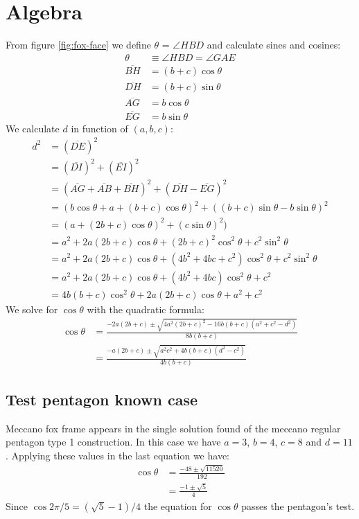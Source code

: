 \documentclass[11pt]{article}
\begin{document}
\section{Algebra}
From figure \ref{fig:fox-face} we define $\theta$ = $\angle{HBD}$ and calculate sines and cosines:
\begin{align}
\theta &\equiv \angle{HBD} = \angle{GAE}\\
\overline{BH} &= (b+c)\cos{\theta}\\
\overline{DH} &= (b+c)\sin{\theta}\\
\overline{AG} &= b\cos{\theta}\\
\overline{EG} &= b\sin{\theta}
\end{align}
We calculate $d$ in function of $(a,b,c)$:
\begin{align}
d^2 &= (\overline{DE})^2 \nonumber\\
 &= (\overline{DI})^2 + (\overline{EI})^2 \nonumber\\
 &= (\overline{AG} + \overline{AB} + \overline{BH})^2 + (\overline{DH} - \overline{EG})^2\\
 &= (b\cos{\theta} + a + (b+c)\cos{\theta})^2 + ((b+c)\sin{\theta} - b\sin{\theta})^2\\
 &= (a + (2b+c)\cos{\theta})^2 + (c\sin{\theta})^2)\nonumber\\
 &= a^2 + 2a(2b+c)\cos{\theta} + (2b+c)^2\cos^2{\theta} + c^2\sin^2{\theta}\nonumber\\
 &= a^2 + 2a(2b+c)\cos{\theta} + (4b^2 + 4bc + c^2)\cos^2{\theta} + c^2\sin^2{\theta}\nonumber\\
 &= a^2 + 2a(2b+c)\cos{\theta} + (4b^2 + 4bc)\cos^2{\theta} + c^2\nonumber\\
 &= 4b(b + c)\cos^2{\theta} + 2a(2b+c)\cos{\theta} + a^2 + c^2
\end{align}
We solve for $\cos{\theta}$ with the quadratic formula:
\begin{align}
\cos{\theta} &= \frac{-2a(2b+c) \pm \sqrt{4a^2(2b+c)^2 - 16b(b+c)(a^2 + c^2 - d^2)}}{8b(b+c)} \nonumber\\
 &= \frac{-a(2b+c) \pm \sqrt{a^2c^2 + 4b(b+c)(d^2-c^2)}}{4b(b+c)}
\end{align}

\subsection{Test pentagon known case}
Meccano fox frame appears in the single solution found of the meccano regular pentagon type 1 construction.
In this case we have $a=3$, $b=4$, $c=8$ and $d=11$. Applying these values in the last equation we have:
\begin{align}
\cos{\theta} &= \frac{-48 \pm \sqrt{11520}}{192} \nonumber\\
 &= \frac{-1 \pm \sqrt{5}}{4}
\end{align}
Since $\cos{2\pi/5} = (\sqrt{5} - 1)/4$ the equation for $\cos{\theta}$ passes the pentagon's test.
\end{document}
